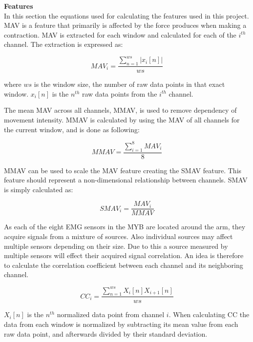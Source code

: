 
\textbf{Features} \\
In this section the equations used for calculating the features used in this project. \\
MAV is a feature that primarily is affected by the force produces when making a contraction. MAV is extracted for each window and calculated for each of the $i^{th}$ channel. The extraction is expressed as:

\begin{equation} \label{eq:MAV}
MAV_i=\frac{\sum\limits_{n=1}^{ws}|x_i[n]|}{ws}
\end{equation}

where $ws$ is the window size, the number of raw data points in that exact window. $x_i[n]$ is the $n^{th}$ raw data points from the $i^{th}$ channel.  

The mean MAV across all channels, MMAV, is used to remove dependency of movement intensity. MMAV is calculated by using the MAV of all channels for the current window, and is done as following: 

\begin{equation} \label{eq:MMAV}
MMAV=\frac{\sum\limits_{i=1}^{8}MAV_i}{8}
\end{equation}

MMAV can be used to scale the MAV feature creating the SMAV feature. This feature should represent a non-dimensional relationship between channels. SMAV is simply calculated as:

\begin{equation} \label{eq:SMAV}
SMAV_i=\frac{MAV_i}{MMAV}
\end{equation}

As each of the eight EMG sensors in the MYB are located around the arm, they acquire signals from a mixture of sources. Also individual sources may affect multiple sensors depending on their size. Due to this a source measured by multiple sensors will effect their acquired signal correlation. An idea is therefore to calculate the correlation coefficient between each channel and its neighboring channel.  

\begin{equation} \label{eq:CC}
CC_i=\frac{\sum\limits_{n=1}^{ws}X_i[n]X_{i+1}[n]}{ws}
\end{equation}

$X_i[n]$ is the $n^{th}$ normalized data point from channel $i$. When calculating CC the data from each window is normalized by subtracting its mean value from each raw data point, and afterwards divided by their standard deviation. 

